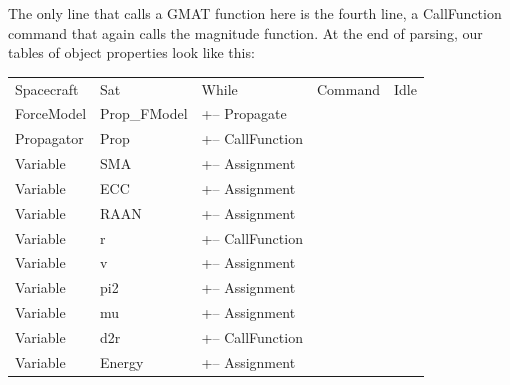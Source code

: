 \noindent The only line that calls a GMAT function here is the fourth line, a CallFunction command
that again calls the magnitude function.  At the end of parsing, our tables of object properties
look like this:

\begin{center}
\tablelasttail{\hline}
\begin{supertabular}{|l l|l|l|l|}
Spacecraft & Sat & While & Command & Idle\\
ForceModel & Prop\_FModel & +-- Propagate & & \\
Propagator & Prop & +-- CallFunction & & \\
Variable & SMA & +-- Assignment & & \\
Variable & ECC & +-- Assignment & & \\
Variable & RAAN & +-- Assignment & & \\
Variable & r & +-- CallFunction & & \\
Variable & v & +-- Assignment & & \\
Variable & pi2 & +-- Assignment & & \\
Variable & mu & +-- Assignment & & \\
Variable & d2r & +-- CallFunction & & \\
Variable & Energy & +-- Assignment & & \\

\end{supertabular}
\end{center}

